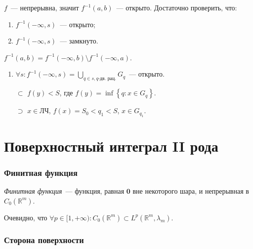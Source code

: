 \documentclass{article}
\begin{document}
            $f$~--- непрерывна, значит $f^{-1}(a, b)$~--- открыто. Достаточно проверить, что:
            
            \begin{enumerate}
            
                \item $f^{-1}(-\infty, s)$~--- открыто;
                
                \item $f^{-1}(-\infty, s)$~--- замкнуто.
                
            \end{enumerate}
            
            $f^{-1}(a, b) = f^{-1}(-\infty, b) \setminus f^{-1}(-\infty, a)$.
            
            \begin{enumerate}
            
                \item $\forall s : f^{-1} (-\infty, s) = \bigcup\limits_{q \in s, q\text{-дв. рац.}} G_q$~--- открыто.
                
                    $\subset$ $f(y) < S$, где $f(y) = \inf \left\{ q : x \in G_q \right\}$.
                    
                    $\supset$ $x \in \text{ЛЧ}$, $f(x) = S_0 < q_1 < S$, $x \in G_{q_1}$.
                
            \end{enumerate}
            
\newpage

\part{Поверхностный интеграл II рода}

    \newpage

    \section{Финитная функция}
    
        \textit{Финитная функция}~--- функция, равная $\mathbf{0}$ вне некоторого шара, и непрерывная в $C_0 \left( \mathbb{R}^m \right)$.
        
        Очевидно, что $\forall p \in [1, +\infty) : C_0 \left( \mathbb{R}^m \right) \subset L^p \left( \mathbb{R}^m, \lambda_m \right)$.
     
    \newpage

    \section{Сторона поверхности}
    
\end{document}
